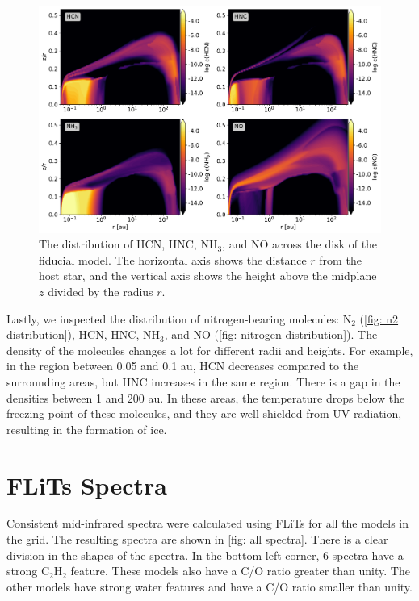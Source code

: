 \documentclass[twoside, single, authoryear, semicolon, 12pt]{lion-msc}
\newcommand{\4}{$_4$}
\newcommand{\3}{$_3$}
\newcommand{\2}{$_2$}
\begin{document}
\begin{figure}[!ht]
    \centering
    \includegraphics[width=\linewidth]{Figures/Abundance2.pdf}
    \caption{The distribution of HCN, HNC, NH\3, and NO across the disk of the fiducial model. The horizontal axis shows the distance $r$ from the host star, and the vertical axis shows the height above the midplane $z$ divided by the radius $r$.}
    \label{fig: nitrogen distribution}
\end{figure}
Lastly, we inspected the distribution of nitrogen-bearing molecules: N\2 (\autoref{fig: n2 distribution}), HCN, HNC, NH\3, and NO (\autoref{fig: nitrogen distribution}). The density of the molecules changes a lot for different radii and heights. For example, in the region between 0.05 and 0.1 au, HCN decreases compared to the surrounding areas, but HNC increases in the same region. There is a gap in the densities between 1 and 200 au. In these areas, the temperature drops below the freezing point of these molecules, and they are well shielded from UV radiation, resulting in the formation of ice. 
\section{FLiTs Spectra}
Consistent mid-infrared spectra were calculated using FLiTs for all the models in the grid. The resulting spectra are shown in \autoref{fig: all spectra}. There is a clear division in the shapes of the spectra. In the bottom left corner, 6 spectra have a strong C\2H\2 feature. These models also have a C/O ratio greater than unity. The other models have strong water features and have a C/O ratio smaller than unity. 
\end{document}
